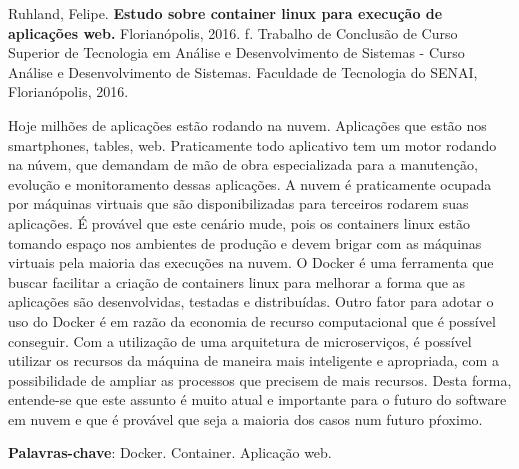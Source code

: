
\noindent
Ruhland, Felipe. \textbf{Estudo sobre container linux para execução de aplicações web.}
Florianópolis, 2016. \pageref{nropaginas}f. Trabalho de Conclusão de Curso Superior de Tecnologia em
Análise e Desenvolvimento de Sistemas - Curso Análise e Desenvolvimento de Sistemas. Faculdade de Tecnologia do
SENAI, Florianópolis, 2016.

\vspace{1cm}
\setlength{\absparsep}{18pt} %
\begin{resumo}
 Hoje milhões de aplicações estão rodando na nuvem. Aplicações que estão nos smartphones, tables, web. Praticamente todo aplicativo tem um motor rodando na núvem, que demandam de mão de obra especializada para a manutenção, evolução e monitoramento dessas aplicações. A nuvem é praticamente ocupada por máquinas virtuais que são disponibilizadas para terceiros rodarem suas aplicações. É provável que este cenário mude, pois os containers linux estão tomando espaço nos ambientes de produção e devem brigar com as máquinas virtuais pela maioria das execuções na nuvem. O Docker é uma ferramenta que buscar facilitar a criação de containers linux para melhorar a forma que as aplicações são desenvolvidas, testadas e distribuídas. Outro fator para adotar o uso do Docker é em razão da economia de recurso computacional que é possível conseguir. Com a utilização de uma arquitetura de microserviços, é possível utilizar os recursos da máquina de maneira mais inteligente e apropriada, com a possibilidade de ampliar as processos que precisem de mais recursos. Desta forma, entende-se que este assunto é muito atual e importante para o futuro do software em nuvem e que é provável que seja a maioria dos casos num futuro pŕoximo.

 \textbf{Palavras-chave}: Docker. Container. Aplicação web.
\end{resumo}
